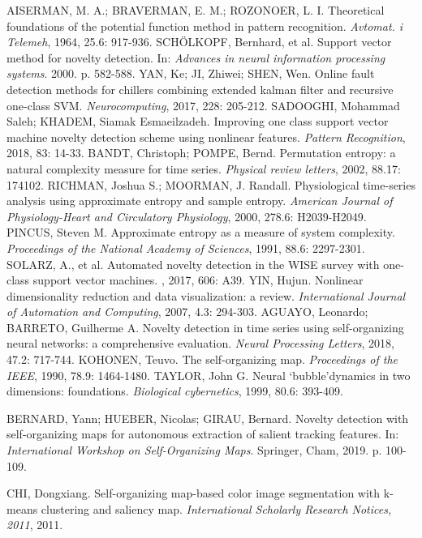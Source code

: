 \documentclass[11pt,twoside,openright]{report}
\begin{document}
\begin{thebibliography}{L}
AISERMAN, M. A.; BRAVERMAN, E. M.; ROZONOER, L. I. Theoretical foundations of the potential function method in pattern recognition. \textit{Avtomat. i Telemeh}, 1964, 25.6: 917-936.
SCHÖLKOPF, Bernhard, et al. Support vector method for novelty detection. In: \textit{Advances in neural information processing systems}. 2000. p. 582-588.
YAN, Ke; JI, Zhiwei; SHEN, Wen. Online fault detection methods for chillers combining extended kalman filter and recursive one-class SVM. \textit{Neurocomputing}, 2017, 228: 205-212.
SADOOGHI, Mohammad Saleh; KHADEM, Siamak Esmaeilzadeh. Improving one class support vector machine novelty detection scheme using nonlinear features. \textit{Pattern Recognition}, 2018, 83: 14-33.
BANDT, Christoph; POMPE, Bernd. Permutation entropy: a natural complexity measure for time series. \textit{Physical review letters}, 2002, 88.17: 174102.
RICHMAN, Joshua S.; MOORMAN, J. Randall. Physiological time-series analysis using approximate entropy and sample entropy. \textit{American Journal of Physiology-Heart and Circulatory Physiology}, 2000, 278.6: H2039-H2049.
PINCUS, Steven M. Approximate entropy as a measure of system complexity. \textit{Proceedings of the National Academy of Sciences}, 1991, 88.6: 2297-2301.
SOLARZ, A., et al. Automated novelty detection in the WISE survey with one-class support vector machines. , 2017, 606: A39.
YIN, Hujun. Nonlinear dimensionality reduction and data visualization: a review. \textit{International Journal of Automation and Computing}, 2007, 4.3: 294-303.
AGUAYO, Leonardo; BARRETO, Guilherme A. Novelty detection in time series using self-organizing neural networks: a comprehensive evaluation. \textit{Neural Processing Letters}, 2018, 47.2: 717-744.
KOHONEN, Teuvo. The self-organizing map. \textit{Proceedings of the IEEE}, 1990, 78.9: 1464-1480.
TAYLOR, John G. Neural ‘bubble’dynamics in two dimensions: foundations. \textit{Biological cybernetics}, 1999, 80.6: 393-409.

BERNARD, Yann; HUEBER, Nicolas; GIRAU, Bernard. Novelty detection with self-organizing maps for autonomous extraction of salient tracking features. In: \textit{International Workshop on Self-Organizing Maps}. Springer, Cham, 2019. p. 100-109.

CHI, Dongxiang. Self-organizing map-based color image segmentation with k-means clustering and saliency map. \textit{International Scholarly Research Notices, 2011}, 2011.


\end{thebibliography}
\end{document}

